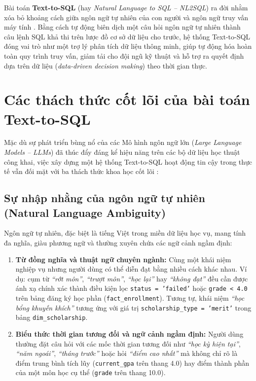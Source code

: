 \documentclass[12pt,a4paper]{report}
\begin{document}
Bài toán \textbf{Text-to-SQL} (hay \textit{Natural Language to SQL -- NL2SQL}) ra đời nhằm xóa bỏ khoảng cách giữa ngôn ngữ tự nhiên của con người và ngôn ngữ truy vấn máy tính \cite{yu2018spider, li2023bird}. Bằng cách tự động biên dịch một câu hỏi ngôn ngữ tự nhiên thành câu lệnh SQL khả thi trên lược đồ cơ sở dữ liệu cho trước, hệ thống Text-to-SQL đóng vai trò như một trợ lý phân tích dữ liệu thông minh, giúp tự động hóa hoàn toàn quy trình truy vấn, giảm tải cho đội ngũ kỹ thuật và hỗ trợ ra quyết định dựa trên dữ liệu (\textit{data-driven decision making}) theo thời gian thực.

\section{Các thách thức cốt lõi của bài toán Text-to-SQL}

Mặc dù sự phát triển bùng nổ của các Mô hình ngôn ngữ lớn (\textit{Large Language Models -- LLMs}) đã thúc đẩy đáng kể hiệu năng trên các bộ dữ liệu học thuật công khai, việc xây dựng một hệ thống Text-to-SQL hoạt động tin cậy trong thực tế vẫn đối mặt với ba thách thức khoa học cốt lõi \cite{wang2025macsql, chen2025enterprise}:

\subsection{Sự nhập nhằng của ngôn ngữ tự nhiên (Natural Language Ambiguity)}
Ngôn ngữ tự nhiên, đặc biệt là tiếng Việt trong miền dữ liệu học vụ, mang tính đa nghĩa, giàu phương ngữ và thường xuyên chứa các ngữ cảnh ngầm định:
\begin{enumerate}
    \item \textbf{Từ đồng nghĩa và thuật ngữ chuyên ngành:} Cùng một khái niệm nghiệp vụ nhưng người dùng có thể diễn đạt bằng nhiều cách khác nhau. Ví dụ: cụm từ \textit{``rớt môn''}, \textit{``trượt môn''}, \textit{``học lại''} hay \textit{``không đạt''} đều cần được ánh xạ chính xác thành điều kiện lọc \texttt{status = 'failed'} hoặc \texttt{grade < 4.0} trên bảng đăng ký học phần (\texttt{fact\_enrollment}). Tương tự, khái niệm \textit{``học bổng khuyến khích''} tương ứng với giá trị \texttt{scholarship\_type = 'merit'} trong bảng \texttt{dim\_scholarship}.
    \item \textbf{Biểu thức thời gian tương đối và ngữ cảnh ngầm định:} Người dùng thường đặt câu hỏi với các mốc thời gian tương đối như \textit{``học kỳ hiện tại''}, \textit{``năm ngoái''}, \textit{``tháng trước''} hoặc hỏi \textit{``điểm cao nhất''} mà không chỉ rõ là điểm trung bình tích lũy (\texttt{current\_gpa} trên thang 4.0) hay điểm thành phần của một môn học cụ thể (\texttt{grade} trên thang 10.0).
\end{enumerate}
\end{document}
